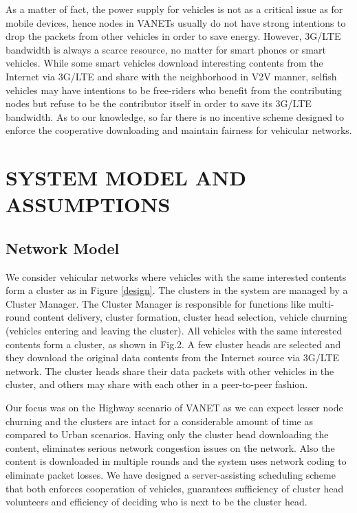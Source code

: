 \documentclass{acm_proc_article-sp}
\begin{document}
As a matter of fact, the power supply for vehicles is not as a critical issue as for mobile devices, hence nodes in VANETs usually do not have strong intentions to drop the packets from other vehicles in order to save energy. However, 3G/LTE bandwidth is always a scarce resource, no matter for smart phones or smart vehicles. While some smart vehicles download interesting contents from the Internet via 3G/LTE and share with the neighborhood in V2V manner, selfish vehicles may have intentions to be free-riders who benefit from the contributing nodes but refuse to be the contributor itself in order to save its 3G/LTE bandwidth. As to our knowledge, so far there is no incentive scheme designed to enforce the cooperative downloading and maintain fairness for vehicular networks.

\section{ SYSTEM MODEL AND ASSUMPTIONS}
\vspace{1 mm}

\subsection{Network Model}
We consider vehicular networks where vehicles with the same interested contents form a cluster as in Figure \ref{design}. The clusters in the system are managed by a Cluster Manager. The Cluster Manager is responsible for functions like multi-round content delivery, cluster formation, cluster head selection, vehicle churning (vehicles entering and leaving the cluster). All vehicles with the same interested contents form a cluster, as shown in Fig.2. A few cluster heads are selected and they download the original data contents from the Internet source via 3G/LTE network. The cluster heads share their data packets with other vehicles in the cluster, and others may share with each other in a peer-to-peer fashion. 

Our focus was on the Highway scenario of VANET as we can expect lesser node churning and the clusters are intact for a considerable amount of time as compared to Urban scenarios. Having only the cluster head downloading the content, eliminates serious network congestion issues on the network. Also the content is downloaded in multiple rounds and the system uses network coding to eliminate packet losses. We have designed a server-assisting scheduling scheme that both enforces cooperation of vehicles, guarantees sufficiency of cluster head volunteers and efficiency of deciding who is next to be the cluster head. 
\end{document}
